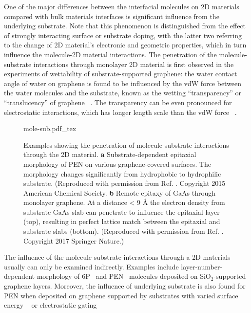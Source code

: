 One of the major differences between the interfacial molecules on 2D
materials compared with bulk materials interfaces is significant
influence from the underlying substrate. Note that this phenomenon is
distinguished from the effect of strongly interacting surface or
substrate doping, with the latter two referring to the change of 2D
material's electronic and geometric properties, which in turn influence
the molecule-2D material interactions. The penetration of the
molecule-substrate interactions through monolayer 2D material is first
observed in the experiments of wettability of substrate-supported
graphene: the water contact angle of water on graphene is found to be
influenced by the vdW force between the water molecules and the
substrate, known as the wetting ``transparency'' or ``translucency''
of graphene
~\autocite{rafiee_2012_transparency,Shih_2012_prl,shih_2013_wetting_natmat}. The
transparency can be even pronounced for electrostatic interactions,
which has longer length scale than the vdW force
~\autocite{Shih_2015_PartiallyScreened,Tian_2016_multiscale}.
\begin{figure}[h]
  \centering
  {mole-sub.pdf_tex}
  \caption{\label{fig:intro-mol-sub}%
    Examples showing the penetration of molecule-substrate
    interactions through the 2D material. \textbf{a}
    Substrate-dependent epitaxial morphology of PEN on various
    graphene-covered surfaces. The morphology changes significantly
    from hydrophobic to hydrophilic substrate. (Reproduced with
    permission from Ref. \cite{Nguyen_2015_pent_gr_wett}. Copyright
    2015 American Chemical Society. \textbf{b} Remote epitaxy of GaAs
    through monolayer graphene. At a distance < 9 Å the electron
    density from substrate GaAs slab can penetrate to influence the
    epitaxial layer (top), resulting in perfect lattice match between
    the epitaxial and substrate slabs (bottom).  (Reproduced with
    permission from Ref. \cite{Kim_2017_remote_epi_Gr}. Copyright 2017
    Springer Nature.)%
  }
\end{figure}
The
influence of the molecule-substrate interactions through a 2D
materials usually can only be examined indirectly.
%
Examples include layer-number-dependent morphology of
6P~\autocite{Kratzer_2014_6P_gr_layer} and
PEN~\autocite{Chhikara_2014_gr_pent_trans} molecules deposited on
SiO\(_{\text{2}}\)-supported graphene layers. Moreover, the influence
of underlying substrate is also found for PEN when deposited on
graphene supported by substrates with varied surface energy
~\autocite{Nguyen_2015_pent_gr_wett} or electrostatic gating

